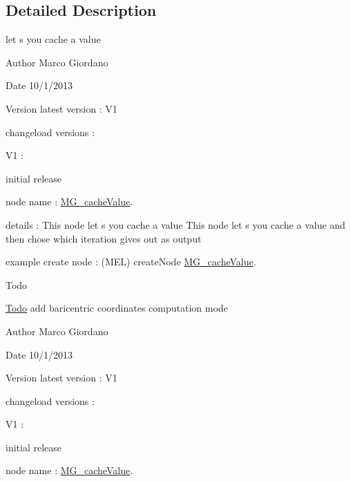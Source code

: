 \subsection{Detailed Description}
let s you cache a value 

\begin{DoxyAuthor}{Author}
Marco Giordano 
\end{DoxyAuthor}
\begin{DoxyDate}{Date}
10/1/2013 
\end{DoxyDate}
\begin{DoxyVersion}{Version}
latest version \-: V1 

changeload versions \-: \par
 V1 \-: \par

\begin{DoxyItemize}
\item initial release \par

\end{DoxyItemize}
\end{DoxyVersion}
node name \-: \hyperlink{class_m_g__cache_value}{M\-G\-\_\-cache\-Value}.

details \-: This node let s you cache a value This node let s you cache a value and then chose which iteration gives out as output

example create node \-: (M\-E\-L) create\-Node \hyperlink{class_m_g__cache_value}{M\-G\-\_\-cache\-Value}.

\begin{DoxyRefDesc}{Todo}
\item[\hyperlink{todo__todo000001}{Todo}]add baricentric coordinates computation mode\end{DoxyRefDesc}


\begin{DoxyAuthor}{Author}
Marco Giordano 
\end{DoxyAuthor}
\begin{DoxyDate}{Date}
10/1/2013 
\end{DoxyDate}
\begin{DoxyVersion}{Version}
latest version \-: V1 

changeload versions \-: \par
 V1 \-: \par

\begin{DoxyItemize}
\item initial release \par

\end{DoxyItemize}
\end{DoxyVersion}
node name \-: \hyperlink{class_m_g__cache_value}{M\-G\-\_\-cache\-Value}.


